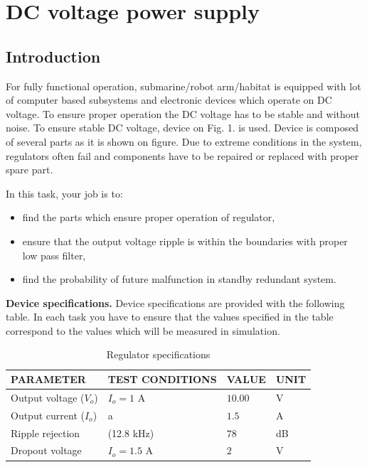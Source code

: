 \documentclass[a4paper]{article}
\begin{document}
\section{DC voltage power supply}

\subsection{Introduction}

For fully functional operation, submarine/robot arm/habitat is equipped with 
lot of computer based subsystems and electronic devices which operate on DC 
voltage. To ensure proper operation the DC voltage has to be stable and without 
noise. To ensure stable DC voltage, device on Fig. 1. is used. Device is 
composed of several parts as it is shown on figure. Due to extreme conditions 
in the system, regulators often fail and components have to be repaired or 
replaced with proper spare part.

In this task, your job is to:
\begin{itemize}
\item find the parts which ensure proper operation of regulator, 
\item ensure that the output voltage ripple is within the boundaries with 
proper low pass filter,
\item find the probability of future malfunction in standby redundant system.
\end{itemize}

\textbf{Device specifications.} Device specifications are provided with 
the following table. In each task you have to ensure that the values specified
in the table correspond to the values which will be measured in simulation. 

\begin{table}[h!]
    \caption{Regulator specifications}
    \label{tab:spec}
    \begin{tabularx}{\linewidth}{|X|X|X|X|} \hline
    PARAMETER & TEST CONDITIONS & VALUE & UNIT \\ \hline 
    Output voltage ($V_o$)& $I_o = 1$ A & $10.00$ & V \\ \hline
    Output current ($I_o$) & a & $1.5$ & A \\ \hline
    Ripple rejection & (12.8 kHz) & $78$ & dB \\ \hline
   	Dropout voltage & $I_o = 1.5$ A & $2$ & V \\ \hline
    \end{tabularx}
\end{table}
\end{document}
